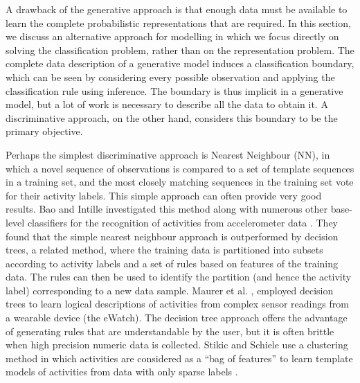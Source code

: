 A drawback of the generative approach is that enough data must be available to learn the complete probabilistic representations that are required. In this section, we discuss an alternative approach for modelling in which we focus directly on solving the classification problem, rather than on the representation problem. The complete data description of a generative model induces a classification boundary, which can be seen by considering every possible observation and applying the classification rule using inference. The boundary is thus implicit in a generative model, but a lot of work is necessary to describe all the data to obtain it. A discriminative approach, on the other hand, considers this boundary to be the primary objective.

Perhaps the simplest discriminative approach is Nearest Neighbour (NN), in which a novel sequence of observations is compared to a set of template sequences in a training set, and the most closely matching sequences in the training set vote for their activity labels. This simple approach can often provide very good results. Bao and Intille investigated this method along with numerous other base-level classifiers for the recognition of activities from accelerometer data \cite{Bao2004}. They found that the simple nearest neighbour approach is outperformed by decision trees, a related method, where the training data is partitioned into subsets according to activity labels and a set of rules based on features of the training data. The rules can then be used to identify the partition (and hence the activity label) corresponding to a new data sample. Maurer et al. \cite{Maurer2006a}, employed decision trees to learn logical descriptions of activities from complex sensor readings from a wearable device (the eWatch). The decision tree approach offers the advantage of generating rules that are understandable by the user, but it is often brittle when high precision numeric data is collected. Stikic and Schiele use a clustering method in which activities are considered as a “bag of features” to learn template models of activities from data with only sparse labels \cite{Stikic2009}. 

